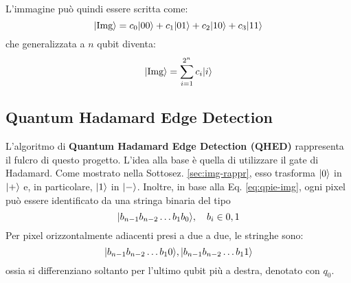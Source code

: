 L'immagine può quindi essere scritta come:
\begin{equation*}
	\lvert\text{Img}\rangle
		= c_0 \lvert00\rangle + c_1 \lvert01\rangle + c_2 \lvert10\rangle + c_3 \lvert11\rangle
	\label{eq:qpie-img-2qubit}
\end{equation*}
che generalizzata a $n$ qubit diventa:
\begin{equation}
	\lvert\text{Img}\rangle
		= \sum_{i=1}^{2^n} c_i \lvert i\rangle
	\label{eq:qpie-img}
\end{equation}


\subsection{Quantum Hadamard Edge Detection}

L'algoritmo di \textbf{Quantum Hadamard Edge Detection (QHED)} \cite{qpie} rappresenta il
fulcro di questo progetto. L'idea alla base è quella di utilizzare il gate di
Hadamard. Come mostrato nella Sottosez.
\ref{sec:img-rappr}, esso trasforma
$\lvert0\rangle$ in $\lvert+\rangle$ e, in particolare, $\lvert1\rangle$ in $\lvert-\rangle$. Inoltre, in
base alla Eq. \ref{eq:qpie-img}, ogni pixel può essere identificato
da una stringa binaria del tipo 
\[
	\lvert b_{n-1}b_{n-2}\ldots b_1b_0\rangle,\quad b_i \in {0,1}
\]
Per pixel orizzontalmente adiacenti presi a due a due, le stringhe sono:
\[
	\lvert b_{n-1}b_{n-2}\ldots b_10\rangle, \lvert b_{n-1}b_{n-2}\ldots b_11\rangle
\]
ossia si differenziano soltanto per l'ultimo qubit più a destra, denotato con $q_0$.


